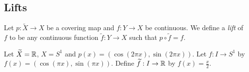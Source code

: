 \subsection{Lifts}
\begin{definition}
Let $p:\widetilde{X}\rightarrow X$ be a covering map and $f:Y\rightarrow X$ be continuous. We define a \textit{lift} of $f$ to be any continuous function $\widetilde{f}:Y\rightarrow X$ such that $p\circ \widetilde{f}=f$.
\end{definition}

\begin{example}
Let $\widetilde{X}=\mathbb R$, $X=S^1$ and $p(x)=\left(\cos(2\pi x),\sin(2\pi x)\right)$. Let $f:I\rightarrow S^1$ by $f(x)=\left(\cos(\pi x),\sin(\pi x)\right)$. Define $\widetilde{f}:I\rightarrow \mathbb R$ by $f(x)=\frac{x}{2}$.
\placeholder
\end{example}

